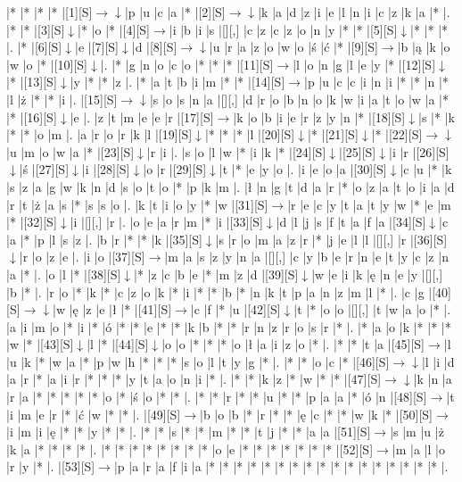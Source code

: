 \documentclass[11pt]{article}
\newcommand\drarr{$\rightarrow \!\!\!\!\! \downarrow$}
\newcommand\rarr{$\rightarrow$}
\newcommand\darr{$\downarrow$}
\begin{document}
\noindent\begin{Puzzle}{24}{27}|*	|*	|*	|*	|[1][S]\drarr	|p	|u	|c	|a	|*	|[2][S]\drarr	|k	|a	|d	|z	|i	|e	|l	|n	|i	|c	|z	|k	|a	|*	|.
|*	|*	|[3][S]\darr	|*	|o	|*	|[4][S]\rarr	|i	|b	|i	|s	|[][,]{ }	|c	|z	|c	|z	|o	|n	|y	|*	|*	|[5][S]\darr	|*	|*	|*	|.
|*	|[6][S]\darr	|e	|[7][S]\darr	|d	|[8][S]\drarr	|u	|r	|a	|z	|o	|w	|o	|ś	|ć	|*	|[9][S]\rarr	|b	|ą	|k	|o	|w	|o	|*	|[10][S]\darr	|.
|*	|g	|n	|o	|c	|o	|*	|*	|*	|[11][S]\rarr	|l	|o	|n	|g	|l	|e	|y	|*	|[12][S]\darr	|*	|[13][S]\darr	|y	|*	|*	|z	|.
|*	|a	|t	|b	|i	|m	|*	|*	|[14][S]\rarr	|p	|u	|c	|c	|i	|n	|i	|*	|*	|n	|*	|l	|ż	|*	|*	|i	|.
|[15][S]\drarr	|s	|o	|s	|n	|a	|[][,]{ }	|d	|r	|o	|b	|n	|o	|k	|w	|i	|a	|t	|o	|w	|a	|*	|*	|[16][S]\darr	|e	|.
|z	|t	|m	|e	|e	|r	|[17][S]\rarr	|k	|o	|b	|i	|e	|r	|z	|y	|n	|*	|[18][S]\darr	|s	|*	|k	|*	|*	|o	|m	|.
|a	|r	|o	|r	|k	|l	|[19][S]\darr	|*	|*	|*	|l	|[20][S]\darr	|*	|[21][S]\darr	|*	|[22][S]\drarr	|u	|m	|o	|w	|a	|*	|[23][S]\darr	|r	|i	|.
|s	|o	|l	|w	|*	|i	|k	|*	|[24][S]\darr	|[25][S]\darr	|i	|r	|[26][S]\darr	|ś	|[27][S]\darr	|i	|[28][S]\darr	|o	|r	|[29][S]\darr	|t	|*	|e	|y	|o	|.
|i	|e	|o	|a	|[30][S]\darr	|c	|u	|*	|k	|s	|z	|a	|g	|w	|k	|n	|d	|s	|o	|t	|o	|*	|p	|k	|m	|.
|ł	|n	|g	|t	|d	|a	|r	|*	|o	|z	|a	|t	|o	|i	|a	|d	|r	|t	|ż	|a	|s	|*	|s	|s	|o	|.
|k	|t	|i	|o	|y	|*	|w	|[31][S]\rarr	|r	|e	|c	|y	|t	|a	|t	|y	|w	|*	|e	|m	|*	|[32][S]\darr	|i	|[][,]{ }	|r	|.
|o	|e	|a	|r	|m	|*	|i	|[33][S]\darr	|d	|l	|j	|s	|f	|t	|a	|f	|a	|[34][S]\darr	|c	|a	|*	|p	|l	|s	|z	|.
|b	|r	|*	|*	|k	|[35][S]\darr	|s	|r	|o	|m	|a	|z	|r	|*	|j	|e	|l	|l	|[][,]{ }	|r	|[36][S]\darr	|r	|o	|z	|e	|.
|i	|o	|[37][S]\rarr	|m	|a	|s	|z	|y	|n	|a	|[][,]{ }	|c	|y	|b	|e	|r	|n	|e	|t	|y	|c	|z	|n	|a	|*	|.
|o	|l	|*	|[38][S]\darr	|*	|z	|c	|b	|e	|*	|m	|z	|d	|[39][S]\darr	|w	|e	|i	|k	|ę	|n	|e	|y	|[][,]{ }	|b	|*	|.
|r	|o	|*	|k	|*	|c	|z	|o	|k	|*	|i	|*	|*	|b	|*	|n	|k	|t	|p	|a	|n	|z	|m	|l	|*	|.
|c	|g	|[40][S]\drarr	|w	|ę	|z	|e	|ł	|*	|[41][S]\rarr	|c	|f	|*	|u	|[42][S]\darr	|t	|*	|o	|o	|[][,]{ }	|t	|w	|a	|o	|*	|.
|a	|i	|m	|o	|*	|i	|*	|ó	|*	|*	|e	|*	|*	|k	|b	|*	|*	|r	|n	|z	|r	|o	|s	|r	|*	|.
|*	|a	|o	|k	|*	|*	|*	|w	|*	|[43][S]\darr	|l	|*	|[44][S]\darr	|o	|o	|*	|*	|*	|o	|ł	|a	|i	|z	|o	|*	|.
|*	|*	|t	|a	|[45][S]\rarr	|l	|u	|k	|*	|w	|a	|*	|p	|w	|h	|*	|*	|*	|s	|o	|l	|t	|y	|g	|*	|.
|*	|*	|o	|c	|*	|[46][S]\drarr	|l	|i	|d	|a	|r	|*	|a	|i	|r	|*	|*	|*	|y	|t	|a	|o	|n	|i	|*	|.
|*	|*	|k	|z	|*	|w	|*	|*	|[47][S]\drarr	|k	|n	|a	|r	|a	|*	|*	|*	|*	|*	|o	|*	|ś	|o	|*	|*	|.
|*	|*	|r	|*	|*	|u	|*	|*	|p	|a	|a	|*	|ó	|n	|[48][S]\rarr	|t	|i	|m	|e	|r	|*	|ć	|w	|*	|*	|.
|[49][S]\rarr	|b	|o	|b	|*	|r	|*	|*	|ę	|c	|*	|*	|w	|k	|*	|[50][S]\rarr	|i	|m	|i	|ę	|*	|*	|y	|*	|*	|.
|*	|*	|s	|*	|*	|m	|*	|*	|t	|j	|*	|*	|a	|a	|[51][S]\rarr	|s	|m	|u	|ż	|k	|a	|*	|*	|*	|*	|.
|*	|*	|*	|*	|*	|*	|*	|*	|o	|e	|*	|*	|*	|*	|*	|*	|*	|[52][S]\rarr	|m	|a	|l	|o	|r	|y	|*	|.
|[53][S]\rarr	|p	|a	|r	|a	|f	|i	|a	|*	|*	|*	|*	|*	|*	|*	|*	|*	|*	|*	|*	|*	|*	|*	|*	|*	|.\end{Puzzle}
\end{document}
